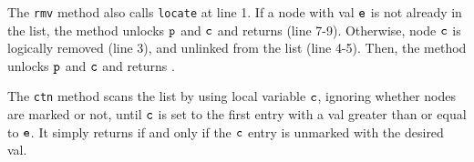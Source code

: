 The {\tt rmv} method also calls {\tt locate} at line 1. If a node with val $\tt e$ is  not already in the list, the method unlocks $\tt p$ and $\tt c$ and returns \false (line 7-9). Otherwise, node $\tt c$ is logically removed (line 3), and unlinked from the list (line 4-5). Then, the method unlocks $\tt p$ and $\tt c$ and returns \true.  

The {\tt ctn} method scans the list by using local variable $\tt c$, ignoring whether nodes are marked or not, until $\tt c$ is set to the
first entry with a val greater than or equal to $\tt e$. It simply returns \true \; if and only if the $\tt c$ entry is unmarked with the desired val.    
%    
%
%    
%    
%        
%    
%    

